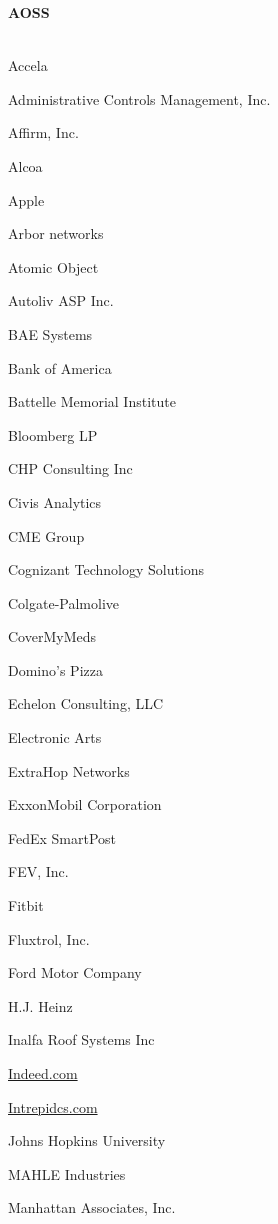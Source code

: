 \documentclass[twoside]{article}
\begin{document}
\begin{center}
\begin{multicols}{5}
        \vspace{1em}
        {\fontsize{14}{16}\selectfont \bf AOSS}\\
        \vspace{-1em}
        ~\hrulefill~
        \vspace{-.9em}
        \begin{FlushLeft}
        \begin{compactitem}
        \item Accela
\item Administrative Controls Management, Inc.
\item Affirm, Inc.
\item Alcoa
\item Apple
\item Arbor networks
\item Atomic Object
\item Autoliv ASP Inc.
\item BAE Systems
\item Bank of America
\item Battelle Memorial Institute
\item Bloomberg LP
\item CHP Consulting Inc
\item Civis Analytics
\item CME Group
\item Cognizant Technology Solutions
\item Colgate-Palmolive
\item CoverMyMeds
\item Domino's Pizza
\item Echelon Consulting, LLC
\item Electronic Arts
\item ExtraHop Networks
\item ExxonMobil Corporation
\item FedEx SmartPost
\item FEV, Inc.
\item Fitbit
\item Fluxtrol, Inc.
\item Ford Motor Company
\item H.J. Heinz
\item Inalfa Roof Systems Inc
\item \url{Indeed.com}
\item \url{Intrepidcs.com}
\item Johns Hopkins University
\item MAHLE Industries
\item Manhattan Associates, Inc.

\end{compactitem}
\end{FlushLeft}
\end{multicols}
\end{center}
\end{document}
